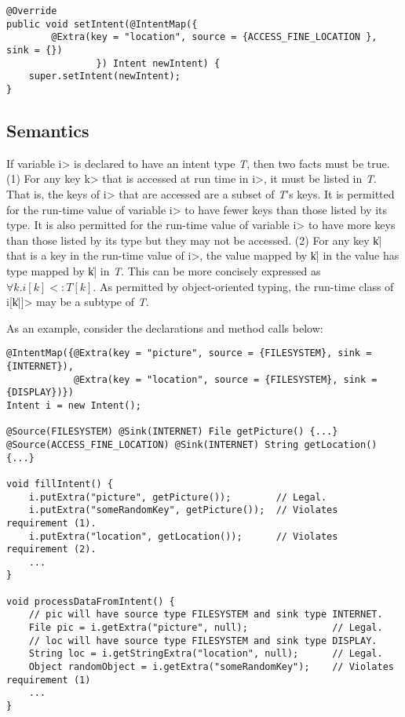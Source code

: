 \begin{Verbatim}
@Override
public void setIntent(@IntentMap({
        @Extra(key = "location", source = {ACCESS_FINE_LOCATION }, sink = {})
                }) Intent newIntent) {
    super.setIntent(newIntent);
}
\end{Verbatim}

\subsection{Semantics}
If variable \<i> is declared to have an intent type \textit{T}, then two facts must be
true. (1) For any key \<k> that is accessed at run time in \<i>, it must be
listed in \textit{T}. That is, the keys of \<i> that are accessed are
a subset of \textit{T}'s keys. It is
permitted for the run-time value of variable \<i> to have fewer keys than those
listed by its type. It is also permitted for the run-time value of variable
\<i> to have more keys than those listed by its type but they may not be
accessed. (2) For any key \|k| that is a key in the run-time value of \<i>,
the value mapped by \|k| in the value has type mapped by \|k| in \textit{T}. 
This can be more concisely expressed as $\forall k.i[k] <: T[k]$. As permitted
by object-oriented typing, the run-time class of \<i[\|k|]> may be a subtype of \textit{T}.

As an example, consider the declarations and method calls below:

\begin{Verbatim}
@IntentMap({@Extra(key = "picture", source = {FILESYSTEM}, sink = {INTERNET}),
            @Extra(key = "location", source = {FILESYSTEM}, sink = {DISPLAY})}) 
Intent i = new Intent();

@Source(FILESYSTEM) @Sink(INTERNET) File getPicture() {...}
@Source(ACCESS_FINE_LOCATION) @Sink(INTERNET) String getLocation() {...}

void fillIntent() {
    i.putExtra("picture", getPicture());        // Legal.
    i.putExtra("someRandomKey", getPicture());  // Violates requirement (1).
    i.putExtra("location", getLocation());      // Violates requirement (2).
    ...
}

void processDataFromIntent() {
    // pic will have source type FILESYSTEM and sink type INTERNET.
    File pic = i.getExtra("picture", null);               // Legal.
    // loc will have source type FILESYSTEM and sink type DISPLAY.
    String loc = i.getStringExtra("location", null);      // Legal.
    Object randomObject = i.getExtra("someRandomKey");    // Violates requirement (1)
    ...
}
\end{Verbatim}

